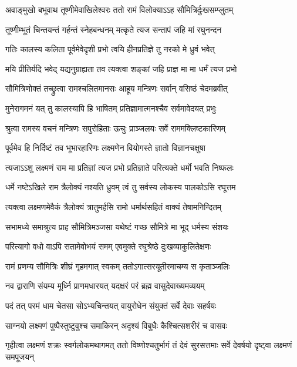 \twolineshloka
{अवाङ्मुखो बभूवाथ तूष्णीमेवाखिलेश्वरः}
{ततो रामं विलोक्याऽऽह सौमित्रिर्दुःखसम्प्लुतम्} %

\twolineshloka
{तूष्णीम्भूतं चिन्तयन्तं गर्हन्तं स्नेहबन्धनम्}
{मत्कृते त्यज सन्तापं जहि मां रघुनन्दन} %

\twolineshloka
{गतिः कालस्य कलिता पूर्वमेवेदृशी प्रभो}
{त्वयि हीनप्रतिज्ञे तु नरको मे ध्रुवं भवेत्} %

\twolineshloka
{मयि प्रीतिर्यदि भवेद् यद्यनुग्राह्यता तव}
{त्यक्त्वा शङ्कां जहि प्राज्ञ मा मा धर्मं त्यज प्रभो} %

\twolineshloka
{सौमित्रिणोक्तं तच्छ्रुत्वा रामश्चलितमानसः}
{आहूय मन्त्रिणः सर्वान् वसिष्ठं चेदमब्रवीत्} %

\twolineshloka
{मुनेरागमनं यत् तु कालस्यापि हि भाषितम्}
{प्रतिज्ञामात्मनश्चैव सर्वमावेदयत् प्रभुः} %

\twolineshloka
{श्रुत्वा रामस्य वचनं मन्त्रिणः सपुरोहिताः}
{ऊचुः प्राञ्जलयः सर्वे राममक्लिष्टकारिणम्} %

\twolineshloka
{पूर्वमेव हि निर्दिष्टं तव भूभारहारिणः}
{लक्ष्मणेन वियोगस्ते ज्ञातो विज्ञानचक्षुषा} %

\twolineshloka
{त्यजाऽऽशु लक्ष्मणं राम मा प्रतिज्ञां त्यज प्रभो}
{प्रतिज्ञाते परित्यक्ते धर्मो भवति निष्फलः} %

\twolineshloka
{धर्मे नष्टेऽखिले राम त्रैलोक्यं नश्यति ध्रुवम्}
{त्वं तु सर्वस्य लोकस्य पालकोऽसि रघूत्तम} %

\twolineshloka
{त्यक्त्वा लक्ष्मणमेवैकं त्रैलोक्यं त्रातुमर्हसि}
{रामो धर्मार्थसहितं वाक्यं तेषामनिन्दितम्} %

\twolineshloka
{सभामध्ये समाश्रुत्य प्राह सौमित्रिमञ्जसा}
{यथेष्टं गच्छ सौमित्रे मा भूद् धर्मस्य संशयः} %

\twolineshloka
{परित्यागो वधो वाऽपि सतामेवोभयं समम्}
{एवमुक्ते रघुश्रेष्ठे दुःखव्याकुलितेक्षणः} %

\twolineshloka
{रामं प्रणम्य सौमित्रिः शीघ्रं गृहमगात् स्वकम्}
{ततोऽगात्सरयूतीरमाचम्य स कृताञ्जलिः} %

\twolineshloka
{नव द्वाराणि संयम्य मूर्ध्नि प्राणमधारयत्}
{यदक्षरं परं ब्रह्म वासुदेवाख्यमव्ययम्} %

\twolineshloka
{पदं तत् परमं धाम चेतसा सोऽभ्यचिन्तयत्}
{वायुरोधेन संयुक्तं सर्वे देवाः सहर्षयः} %

\twolineshloka
{साग्नयो लक्ष्मणं पुष्पैस्तुष्टुवुश्च समाकिरन्}
{अदृश्यं विबुधैः कैश्चित्सशरीरं च वासवः} %

\threelineshloka
{गृहीत्वा लक्ष्मणं शक्रः स्वर्गलोकमथागमत्}
{ततो विष्णोश्चतुर्भागं तं देवं सुरसत्तमाः}
{सर्वे देवर्षयो दृष्ट्वा लक्ष्मणं समपूजयन्} %

